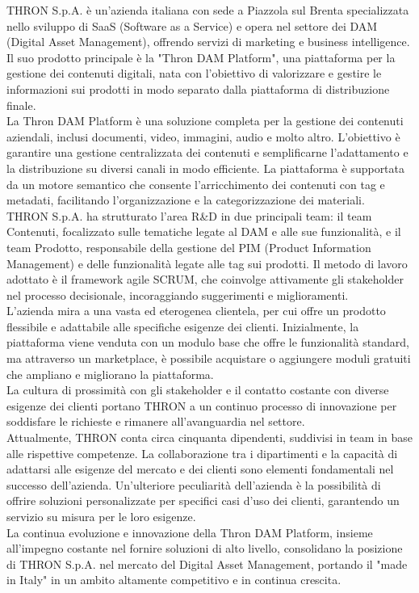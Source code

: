 THRON S.p.A. è un'azienda italiana  con sede a Piazzola sul Brenta specializzata nello sviluppo di SaaS (Software as a Service) e opera nel settore dei DAM (Digital Asset Management), offrendo servizi di marketing e business intelligence. \\
Il suo prodotto principale è la "Thron DAM Platform", una piattaforma per la gestione dei contenuti digitali, nata con l'obiettivo di valorizzare e gestire le informazioni sui prodotti in modo separato dalla piattaforma di distribuzione finale. \\
La Thron DAM Platform è una soluzione completa per la gestione dei contenuti aziendali, inclusi documenti, video, immagini, audio e molto altro. L'obiettivo è garantire una gestione centralizzata dei contenuti e semplificarne l'adattamento e 
la distribuzione su diversi canali in modo efficiente. La piattaforma è supportata da un motore semantico che consente l'arricchimento dei contenuti con tag e metadati, facilitando l'organizzazione e la categorizzazione dei materiali. \\
THRON S.p.A. ha strutturato l'area R&D in due principali team: il team Contenuti, focalizzato sulle tematiche legate al DAM e alle sue funzionalità, e il team Prodotto, responsabile della gestione del PIM (Product Information Management) 
e delle funzionalità legate alle tag sui prodotti. Il metodo di lavoro adottato è il framework agile SCRUM, che coinvolge attivamente gli stakeholder nel processo decisionale, incoraggiando suggerimenti e miglioramenti. \\
L'azienda mira a una vasta ed eterogenea clientela, per cui offre un prodotto flessibile e adattabile alle specifiche esigenze dei clienti. Inizialmente, la piattaforma viene venduta con un modulo base che offre le funzionalità standard, ma attraverso un marketplace, è 
possibile acquistare o aggiungere moduli gratuiti che ampliano e migliorano la piattaforma. \\
La cultura di prossimità con gli stakeholder e il contatto costante con diverse esigenze dei clienti portano THRON a un continuo processo di innovazione per soddisfare le richieste e rimanere all'avanguardia nel settore. \\
Attualmente, THRON conta circa cinquanta dipendenti, suddivisi in team in base alle rispettive competenze. La collaborazione tra i dipartimenti e la capacità di adattarsi alle esigenze del mercato e dei clienti sono elementi fondamentali
 nel successo dell'azienda. Un'ulteriore peculiarità dell'azienda è la possibilità di offrire soluzioni personalizzate per specifici casi d'uso dei clienti, garantendo un servizio su misura per le loro esigenze. \\
La continua evoluzione e innovazione della Thron DAM Platform, insieme all'impegno costante nel fornire soluzioni di alto livello, consolidano la posizione di THRON S.p.A. nel mercato del Digital Asset Management, 
portando il "made in Italy" in un ambito altamente competitivo e in continua crescita. \\

